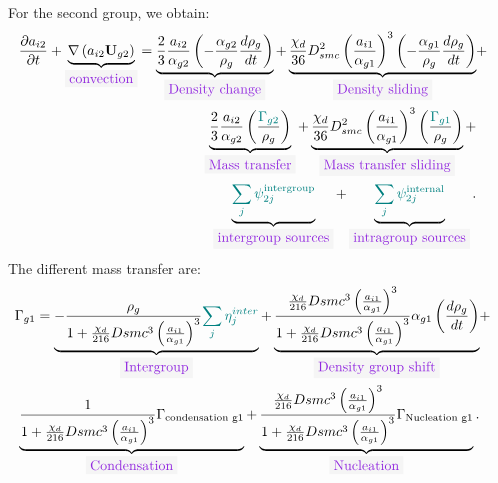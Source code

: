 For the second group, we obtain:
\begin{equation}
\begin{aligned}
\frac{\partial a_{i2}}{\partial t}+\underbrace{\nabla\parent{a_{i2}\mathbf{U}_{g2}}}_{\colorbox{codebackground}{\color{codekeyword3} convection}}=\underbrace{\frac{2}{3}\frac{a_{i2}}{\alpha_{g2}}\parent{-\frac{\alpha_{g2}}{\rho_g}\frac{d \rho_g}{dt}}}_{\colorbox{codebackground}{\color{codekeyword3} Density\ change}}+\underbrace{\frac{\chi_d}{36}D_{smc}^2\parent{\frac{a_{i1}}{\alpha_{g1}}}^3\parent{-\frac{\alpha_{g1}}{\rho_g}\frac{d \rho_g}{dt}}}_{\colorbox{codebackground}{\color{codekeyword3} Density\ sliding}}&+ & \\
\underbrace{\frac{2}{3}\frac{a_{i2}}{\alpha_{g2}}\parent{\frac{\color{myteal}\Gamma_{g2}}{\rho_g}}}_{\colorbox{codebackground}{\color{codekeyword3} Mass\ transfer}} +\underbrace{\frac{\chi_d}{36}D_{smc}^2\parent{\frac{a_{i1}}{\alpha_{g1}}}^3\parent{\frac{\color{myteal}\Gamma_{g1}}{\rho_g} }}_{\colorbox{codebackground}{\color{codekeyword3} Mass\ transfer\ sliding}} +& \\
\underbrace{\color{myteal}\sum_j \psi^{\text{intergroup}}_{2j}}_{\colorbox{codebackground}{\color{codekeyword3} intergroup\ sources}} + \underbrace{\color{myteal}\sum_j \psi^{\text{internal}}_{2j}}_{\colorbox{codebackground}{\color{codekeyword3} intragroup sources}}.
\end{aligned}
\end{equation}
The different mass transfer are:
\begin{equation}
\begin{aligned}
\Gamma_{g1} = \underbrace{-\frac{\rho_g}{1+\frac{\chi_d}{216}Dsmc^3\parent{\frac{a_{i1}}{\alpha_{g1}}}^3}{\color{myteal}\sum_j \eta^{inter}_j}}_{\colorbox{codebackground}{\color{codekeyword3} Intergroup}}+ \underbrace{\frac{\frac{\chi_d}{216}Dsmc^3\parent{\frac{a_{i1}}{\alpha_{g1}}}^3}{1+\frac{\chi_d}{216}Dsmc^3\parent{\frac{a_{i1}}{\alpha_{g1}}}^3}\alpha_{g1}\parent{\frac{d\rho_{g}}{dt}}}_{\colorbox{codebackground}{\color{codekeyword3} Density\ group\ shift}}&+& \\
\underbrace{\frac{1}{1+\frac{\chi_d}{216}Dsmc^3\parent{\frac{a_{i1}}{\alpha_{g1}}}^3}\Gamma_{\text{condensation g1}}}_{\colorbox{codebackground}{\color{codekeyword3} Condensation}}+\underbrace{\frac{\frac{\chi_d}{216}Dsmc^3\parent{\frac{a_{i1}}{\alpha_{g1}}}^3}{1+\frac{\chi_d}{216}Dsmc^3\parent{\frac{a_{i1}}{\alpha_{g1}}}^3}\Gamma_{\text{Nucleation g1}}}_{\colorbox{codebackground}{\color{codekeyword3} Nucleation}}.
\end{aligned}
\end{equation}
